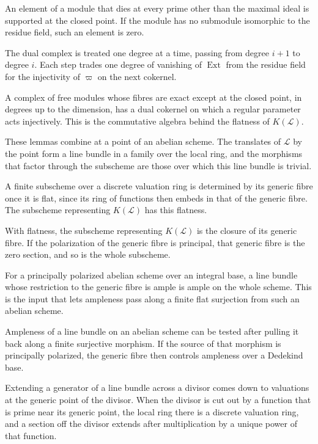An element of a module that dies at every prime other than the maximal ideal is supported at the closed point. If
the module has no submodule isomorphic to the residue field, such an element is zero.

The dual complex is treated one degree at a time, passing from degree $i+1$ to degree $i$. Each step trades one
degree of vanishing of $\operatorname{Ext}$ from the residue field for the injectivity of $\varpi$ on the next
cokernel.

A complex of free modules whose fibres are exact except at the closed point, in degrees up to the dimension, has
a dual cokernel on which a regular parameter acts injectively. This is the commutative algebra behind the
flatness of $K(\mathcal L)$.

These lemmas combine at a point of an abelian scheme. The translates of $\mathcal L$ by the point form a line
bundle in a family over the local ring, and the morphisms that factor through the subscheme are those over
which this line bundle is trivial.

A finite subscheme over a discrete valuation ring is determined by its generic fibre once it is flat, since
its ring of functions then embeds in that of the generic fibre. The subscheme representing $K(\mathcal L)$
has this flatness.

With flatness, the subscheme representing $K(\mathcal L)$ is the closure of its generic fibre. If the
polarization of the generic fibre is principal, that generic fibre is the zero section, and so is the whole
subscheme.

For a principally polarized abelian scheme over an integral base, a line bundle whose restriction to the
generic fibre is ample is ample on the whole scheme. This is the input that lets ampleness pass along a
finite flat surjection from such an abelian scheme.

Ampleness of a line bundle on an abelian scheme can be tested after pulling it back along a finite surjective
morphism. If the source of that morphism is principally polarized, the generic fibre then controls ampleness
over a Dedekind base.

Extending a generator of a line bundle across a divisor comes down to valuations at the generic point of the
divisor. When the divisor is cut out by a function that is prime near its generic point, the local ring there
is a discrete valuation ring, and a section off the divisor extends after multiplication by a unique power of
that function.

